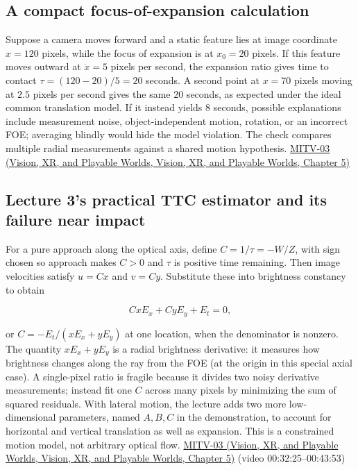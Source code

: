 \subsection{A compact focus-of-expansion calculation}\label{04-visual-computing-ii-ch030-a-compact-focus-of-expansion-calculation}

Suppose a camera moves forward and a static feature lies at image coordinate \(x=120\) pixels, while the focus of expansion is at \(x_0=20\) pixels. If this feature moves outward at \(\dot x=5\) pixels per second, the expansion ratio gives time to contact \(\tau=(120-20)/5=20\) seconds. A second point at \(x=70\) pixels moving at \(2.5\) pixels per second gives the same \(20\) seconds, as expected under the ideal common translation model. If it instead yields \(8\) seconds, possible explanations include measurement noise, object-independent motion, rotation, or an incorrect FOE; averaging blindly would hide the model violation. The check compares multiple radial measurements against a shared motion hypothesis. \href{../07-Vision-XR-and-Playable-Worlds/main.pdf\#nameddest=04-visual-computing-ii-ch036-mitv-03---time-to-contact-focus-of-expansion-direct-motion-vision-methods-noise-gain}{MITV-03 (Vision, XR, and Playable Worlds, Vision, XR, and Playable Worlds, Chapter 5)}

\subsection{Lecture 3's practical TTC estimator and its failure near impact}\label{04-visual-computing-ii-ch030-lecture-3s-practical-ttc-estimator-and-its-failure-near-impact}

For a pure approach along the optical axis, define \(C=1/\tau=-W/Z\), with sign chosen so approach makes \(C>0\) and \(\tau\) is positive time remaining. Then image velocities satisfy \(u=Cx\) and \(v=Cy\). Substitute these into brightness constancy to obtain

\[
CxE_x+CyE_y+E_t=0,
\]

or \(C=-E_t/(xE_x+yE_y)\) at one location, when the denominator is nonzero. The quantity \(xE_x+yE_y\) is a radial brightness derivative: it measures how brightness changes along the ray from the FOE (at the origin in this special axial case). A single-pixel ratio is fragile because it divides two noisy derivative measurements; instead fit one \(C\) across many pixels by minimizing the sum of squared residuals. With lateral motion, the lecture adds two more low-dimensional parameters, named \(A,B,C\) in the demonstration, to account for horizontal and vertical translation as well as expansion. This is a constrained motion model, not arbitrary optical flow. \href{../07-Vision-XR-and-Playable-Worlds/main.pdf\#nameddest=04-visual-computing-ii-ch036-mitv-03---time-to-contact-focus-of-expansion-direct-motion-vision-methods-noise-gain}{MITV-03 (Vision, XR, and Playable Worlds, Vision, XR, and Playable Worlds, Chapter 5)} (video 00:32:25--00:43:53)

